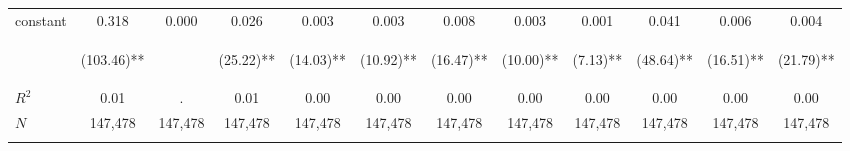 \begin{tabular}{lccccccccccc}
\noalign{\smallskip}constant & 0.318 & 0.000 & 0.026 & 0.003 & 0.003 & 0.008 & 0.003 & 0.001 & 0.041 & 0.006 & 0.004\\
 & \begin{footnotesize}(103.46)**\end{footnotesize} & \begin{footnotesize}\end{footnotesize} & \begin{footnotesize}(25.22)**\end{footnotesize} & \begin{footnotesize}(14.03)**\end{footnotesize} & \begin{footnotesize}(10.92)**\end{footnotesize} & \begin{footnotesize}(16.47)**\end{footnotesize} & \begin{footnotesize}(10.00)**\end{footnotesize} & \begin{footnotesize}(7.13)**\end{footnotesize} & \begin{footnotesize}(48.64)**\end{footnotesize} & \begin{footnotesize}(16.51)**\end{footnotesize} & \begin{footnotesize}(21.79)**\end{footnotesize}\\
\noalign{\smallskip}$R^2$ & 0.01 & . & 0.01 & 0.00 & 0.00 & 0.00 & 0.00 & 0.00 & 0.00 & 0.00 & 0.00\\
$N$ & 147,478 & 147,478 & 147,478 & 147,478 & 147,478 & 147,478 & 147,478 & 147,478 & 147,478 & 147,478 & 147,478\\
\noalign{\smallskip}\bottomrule\end{tabular}
